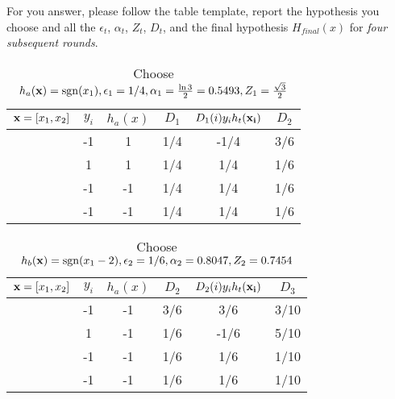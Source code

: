For you answer, please follow the table template, report the
hypothesis you choose and all the $\epsilon_t$, $\alpha_t$, $Z_t$,
$D_t$, and the final hypothesis $H_{final}(x)$ for {\em four
  subsequent rounds}.
\begin{table}[H]
  \centering
  \caption{Choose $h_a({\bf x}) = \operatorname{sgn}(x_1), \epsilon_1 = 1/4, \alpha_1 = \frac{\ln3}{2} =0.5493, Z_1 = \frac{\sqrt{3}}{2}$}
  \label{tab:Ada1}
  \begin{tabular}{|c|c|c|c|c|c|}
    \hline
    ${\bf x} = [x_1,x_2]$ & $y_i$ & $h_a(x)$ & $D_1$ & $D_{1}(i)y_{i}h_t({\bf x_i})$ & $D_2$ \\ \hline
    [1,1]          &     -1  & 1    & 1/4   & -1/4                          &  3/6     \\ \hline
    [1,-1]         &    1   & 1    & 1/4   & 1/4                           &    1/6   \\ \hline
    [-1,-1]        &     -1  & -1    & 1/4   & 1/4                           & 1/6      \\ \hline
    [-1,1]         &     -1 & -1    & 1/4   & 1/4                           &  1/6     \\ \hline
  \end{tabular}
\end{table}

\begin{table}[H]
  \centering
  \caption{Choose $h_b({\bf x}) = \operatorname{sgn}(x_1 - 2), \epsilon_2 = 1/6, \alpha_2 = 0.8047, Z_2 = 0.7454$}
  \label{tab:Ada1}
  \begin{tabular}{|c|c|c|c|c|c|}
    \hline
    ${\bf x} = [x_1,x_2]$ & $y_i$ & $h_a(x)$ & $D_2$ & $D_{2}(i)y_{i}h_t({\bf x_i})$ & $D_3$ \\ \hline
    [1,1]          &     -1  & -1    & 3/6   & 3/6                          &  3/10     \\ \hline
    [1,-1]         &    1   & -1    & 1/6   & -1/6                          &    5/10   \\ \hline
    [-1,-1]        &     -1  & -1    & 1/6   & 1/6                           & 1/10      \\ \hline
    [-1,1]         &     -1 & -1    & 1/6   & 1/6                           &  1/10     \\ \hline
  \end{tabular}
\end{table}


